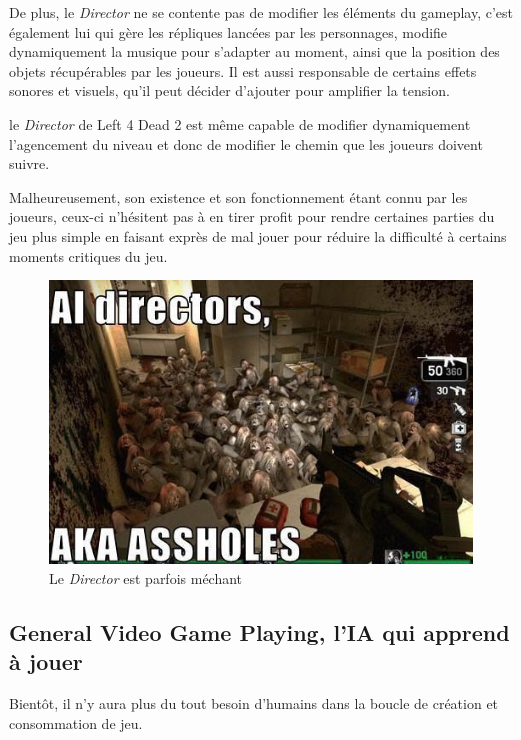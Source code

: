 \documentclass[a4paper, 12pt]{article} %
\begin{document}
\newpage
De plus, le \textit{Director} ne se contente pas de modifier les éléments du gameplay, c’est également lui qui gère les répliques lancées par les personnages, modifie dynamiquement la musique pour s’adapter au moment, ainsi que la position des objets récupérables par les joueurs. Il est aussi responsable de certains effets sonores et visuels, qu’il peut décider d’ajouter pour amplifier la tension.

le \textit{Director} de Left 4 Dead 2 est même capable de modifier dynamiquement l’agencement du niveau et donc de modifier le chemin que les joueurs doivent suivre.

Malheureusement, son existence et son fonctionnement étant connu par les joueurs, ceux-ci n’hésitent pas à en tirer profit pour rendre certaines parties du jeu plus simple en faisant exprès de mal jouer pour réduire la difficulté à certains moments critiques du jeu.

\begin{figure}[!h]%
	\begin{center} 
		\includegraphics[width=0.80\columnwidth]{images/aiDirector2.jpg}%
		\caption{Le \textit{Director} est parfois méchant}%
	\end{center}
\end{figure}


\newpage
\subsection{General Video Game Playing, l'IA qui apprend à jouer}

Bientôt, il n’y aura plus du tout besoin d’humains dans la boucle de création et consommation de jeu.
\end{document}
